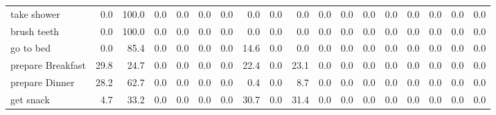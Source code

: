 \documentclass{article}
\begin{document}
\begin{sideways}
\begin{tabular}{lrrrrrrrrrrrrrrrrr}
take shower                   &         0.0 &              100.0 &           0.0 &               0.0 &                0.0 &                0.0 &              0.0 &                      0.0 &                   0.0 &              0.0 &              0.0 &                            0.0 &                      0.0 &                    0.0 &                                  0.0 &                          0.0 &                  0.0 \\
brush teeth                   &         0.0 &              100.0 &           0.0 &               0.0 &                0.0 &                0.0 &              0.0 &                      0.0 &                   0.0 &              0.0 &              0.0 &                            0.0 &                      0.0 &                    0.0 &                                  0.0 &                          0.0 &                  0.0 \\
go to bed                     &         0.0 &               85.4 &           0.0 &               0.0 &                0.0 &                0.0 &             14.6 &                      0.0 &                   0.0 &              0.0 &              0.0 &                            0.0 &                      0.0 &                    0.0 &                                  0.0 &                          0.0 &                  0.0 \\
prepare Breakfast             &        29.8 &               24.7 &           0.0 &               0.0 &                0.0 &                0.0 &             22.4 &                      0.0 &                  23.1 &              0.0 &              0.0 &                            0.0 &                      0.0 &                    0.0 &                                  0.0 &                          0.0 &                  0.0 \\
prepare Dinner                &        28.2 &               62.7 &           0.0 &               0.0 &                0.0 &                0.0 &              0.4 &                      0.0 &                   8.7 &              0.0 &              0.0 &                            0.0 &                      0.0 &                    0.0 &                                  0.0 &                          0.0 &                  0.0 \\
get snack                     &         4.7 &               33.2 &           0.0 &               0.0 &                0.0 &                0.0 &             30.7 &                      0.0 &                  31.4 &              0.0 &              0.0 &                            0.0 &                      0.0 &                    0.0 &                                  0.0 &                          0.0 &                  0.0 \\

\end{tabular}
\end{sideways}
\end{document}
